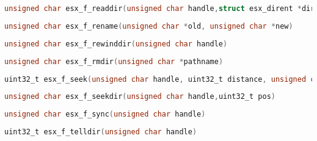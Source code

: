 \documentclass[11pt]{book}
\def\lthtmlcheckvsize{\ifdim\ht\sizebox<\vsize 
  \ifdim\wd\sizebox<\hsize\expandafter\hfill\fi \expandafter\vfill
  \else\expandafter\vss\fi}%
\begin{document}
{\newpage\clearpage
{}%
\begin{lstlisting}[language=C]
unsigned char esx_f_readdir(unsigned char handle,struct esx_dirent *dirent)
\end{lstlisting}%
\lthtmlfigureZ
\lthtmlcheckvsize\clearpage}

{\newpage\clearpage
{}%
\begin{lstlisting}[language=C]
unsigned char esx_f_rename(unsigned char *old, unsigned char *new)
\end{lstlisting}%
\lthtmlfigureZ
\lthtmlcheckvsize\clearpage}

{\newpage\clearpage
{}%
\begin{lstlisting}[language=C]
unsigned char esx_f_rewinddir(unsigned char handle)
\end{lstlisting}%
\lthtmlfigureZ
\lthtmlcheckvsize\clearpage}

{\newpage\clearpage
{}%
\begin{lstlisting}[language=C]
unsigned char esx_f_rmdir(unsigned char *pathname)
\end{lstlisting}%
\lthtmlfigureZ
\lthtmlcheckvsize\clearpage}

{\newpage\clearpage
{}%
\begin{lstlisting}[language=C]
uint32_t esx_f_seek(unsigned char handle, uint32_t distance, unsigned char whence)
\end{lstlisting}%
\lthtmlfigureZ
\lthtmlcheckvsize\clearpage}

{\newpage\clearpage
{}%
\begin{lstlisting}[language=C]
unsigned char esx_f_seekdir(unsigned char handle,uint32_t pos)
\end{lstlisting}%
\lthtmlfigureZ
\lthtmlcheckvsize\clearpage}

{\newpage\clearpage
{}%
\begin{lstlisting}[language=C]
unsigned char esx_f_sync(unsigned char handle)
\end{lstlisting}%
\lthtmlfigureZ
\lthtmlcheckvsize\clearpage}

{\newpage\clearpage
{}%
\begin{lstlisting}[language=C]
uint32_t esx_f_telldir(unsigned char handle)
\end{lstlisting}%
\lthtmlfigureZ
\lthtmlcheckvsize\clearpage}
\end{document}
